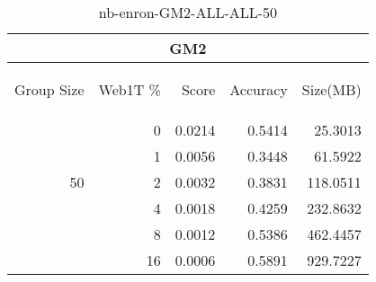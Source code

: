 \begin{center}
\begin{table}[htbp] 
 \begin{center}
\begin{tabular}{ | r | r | r | r | r |}
\hline
\multicolumn{5}{|c|}{GM2}\\
\hline
\begin{sideways}Group Size\end{sideways} & \begin{sideways}Web1T \%\end{sideways} & \begin{sideways}Score\end{sideways} & \begin{sideways}Accuracy\end{sideways} & \begin{sideways}Size(MB)\end{sideways}\\
\hline
\multirow{5}{*}{50}
 & 0 & 0.0214 & 0.5414 & 25.3013\\ \cline{2-5}
 & 1 & 0.0056 & 0.3448 & 61.5922\\ \cline{2-5}
 & 2 & 0.0032 & 0.3831 & 118.0511\\ \cline{2-5}
 & 4 & 0.0018 & 0.4259 & 232.8632\\ \cline{2-5}
 & 8 & 0.0012 & 0.5386 & 462.4457\\ \cline{2-5}
 & 16 & 0.0006 & 0.5891 & 929.7227\\ \cline{2-5}
\hline
\end{tabular}
\caption{nb-enron-GM2-ALL-ALL-50}
\label{table:nb-enron-GM2-ALL-ALL-50}
\end{center}
 \end{table}
\end{center}

